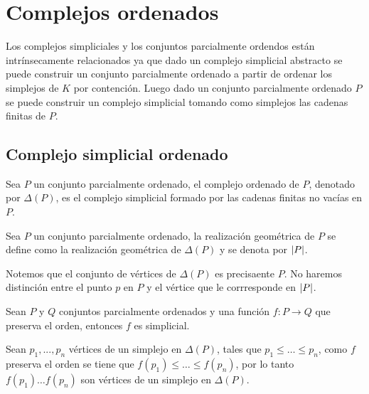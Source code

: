 \chapter{Complejos ordenados}
Los complejos simpliciales y los conjuntos parcialmente ordendos están intrínsecamente relacionados ya que dado un complejo simplicial abstracto se puede construir un conjunto parcialmente ordenado a partir de ordenar los simplejos de $K$ por contención. Luego dado un conjunto parcialmente ordenado $P$ se puede construir un complejo simplicial tomando como simplejos las cadenas finitas de $P$. 
 
\section{Complejo simplicial ordenado}
\begin{Defi}
Sea $P$ un conjunto parcialmente ordenado, el complejo ordenado de $P$, denotado por $\Delta(P)$, es el complejo simplicial formado por las cadenas finitas no vacías en $P$.
\end{Defi}

\begin{Defi}
Sea $P$ un conjunto parcialmente ordenado, la realización geométrica de $P$ se define como la realización geométrica de $\Delta(P)$ y se denota por $\left| P \right|$. 
\end{Defi}

Notemos que el conjunto de vértices de $\Delta(P)$ es precisaente $P$. No haremos distinción entre el punto $p$ en $P$ y el vértice que le corrresponde en $\left| P \right|$.
\begin{Teo}
Sean $P$ y $Q$ conjuntos parcialmente ordenados y una función $f\colon P \rightarrow Q$ que preserva el orden, entonces $f$ es simplicial.
\end{Teo}
\begin{Dem}

Sean $p_1,...,p_n$ vértices de un simplejo en $\Delta(P)$, tales que $p_1\leqslant\dots \leqslant p_n$, como $f$ preserva el orden se tiene que $f(p_1)\leqslant\dots \leqslant f(p_n)$, por lo tanto $f(p_1)\dots f(p_n)$ son vértices de un simplejo en $\Delta(P)$. 
\end{Dem}

